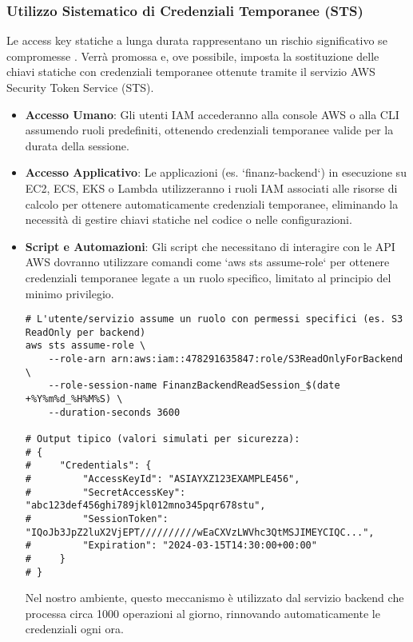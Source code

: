 \subsubsection{Utilizzo Sistematico di Credenziali Temporanee (STS)}

Le access key statiche a lunga durata rappresentano un rischio significativo se compromesse \cite{kazi:leastprivilege}. Verrà promossa e, ove possibile, imposta la sostituzione delle chiavi statiche con credenziali temporanee ottenute tramite il servizio AWS Security Token Service (STS).
\begin{itemize}
    \item \textbf{Accesso Umano}: Gli utenti IAM accederanno alla console AWS o alla CLI assumendo ruoli predefiniti, ottenendo credenziali temporanee valide per la durata della sessione.
    \item \textbf{Accesso Applicativo}: Le applicazioni (es. `finanz-backend`) in esecuzione su EC2, ECS, EKS o Lambda utilizzeranno i ruoli IAM associati alle risorse di calcolo per ottenere automaticamente credenziali temporanee, eliminando la necessità di gestire chiavi statiche nel codice o nelle configurazioni.
    \item \textbf{Script e Automazioni}: Gli script che necessitano di interagire con le API AWS dovranno utilizzare comandi come `aws sts assume-role` per ottenere credenziali temporanee legate a un ruolo specifico, limitato al principio del minimo privilegio.
    \begin{lstlisting}[style=bash, caption={Ottenere credenziali temporanee tramite STS AssumeRole}, label=lst:sts-assume-role]
# L'utente/servizio assume un ruolo con permessi specifici (es. S3 ReadOnly per backend)
aws sts assume-role \
    --role-arn arn:aws:iam::478291635847:role/S3ReadOnlyForBackend \
    --role-session-name FinanzBackendReadSession_$(date +%Y%m%d_%H%M%S) \
    --duration-seconds 3600

# Output tipico (valori simulati per sicurezza):
# {
#     "Credentials": {
#         "AccessKeyId": "ASIAYXZ123EXAMPLE456",
#         "SecretAccessKey": "abc123def456ghi789jkl012mno345pqr678stu",
#         "SessionToken": "IQoJb3JpZ2luX2VjEPT//////////wEaCXVzLWVhc3QtMSJIMEYCIQC...",
#         "Expiration": "2024-03-15T14:30:00+00:00"
#     }
# }
    \end{lstlisting}
    Nel nostro ambiente, questo meccanismo è utilizzato dal servizio backend che processa circa 1000 operazioni al giorno, rinnovando automaticamente le credenziali ogni ora.
\end{itemize}

